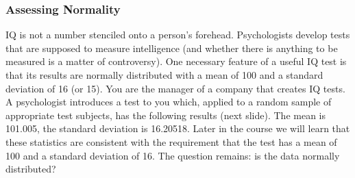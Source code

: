 \documentclass[xcolor=dvipsnames]{beamer}
\begin{document}
\begin{frame}
  \frametitle{Assessing Normality}
  IQ is not a number stenciled onto a person's forehead. Psychologists
  develop tests that are supposed to measure intelligence (and whether
  there is anything to be measured is a matter of controversy). One
  necessary feature of a useful IQ test is that its results are
  normally distributed with a mean of 100 and a standard deviation of
  16 (or 15). You are the manager of a company that creates IQ tests.
  A psychologist introduces a test to you which, applied to a random
  sample of appropriate test subjects, has the following results (next
  slide). The mean is 101.005, the standard deviation is 16.20518.
  Later in the course we will learn that these statistics are
  consistent with the requirement that the test has a mean of 100
  and a standard deviation of 16. The question remains: is the
  data normally distributed?
\end{frame}
\end{document}
